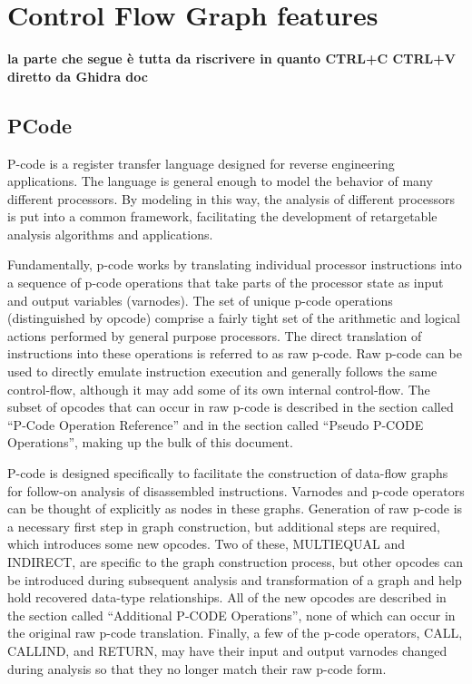 \section{Control Flow Graph features}

\textbf{la parte che segue è tutta da riscrivere in quanto CTRL+C CTRL+V diretto da Ghidra doc} \cite{ghidra_pcode}
\subsection{PCode}
P-code is a register transfer language designed for reverse engineering applications. The language is general enough to model the behavior of many different processors. By modeling in this way, the analysis of different processors is put into a common framework, facilitating the development of retargetable analysis algorithms and applications.

Fundamentally, p-code works by translating individual processor instructions into a sequence of p-code operations that take parts of the processor state as input and output variables (varnodes). The set of unique p-code operations (distinguished by opcode) comprise a fairly tight set of the arithmetic and logical actions performed by general purpose processors. The direct translation of instructions into these operations is referred to as raw p-code. Raw p-code can be used to directly emulate instruction execution and generally follows the same control-flow, although it may add some of its own internal control-flow. The subset of opcodes that can occur in raw p-code is described in the section called “P-Code Operation Reference” and in the section called “Pseudo P-CODE Operations”, making up the bulk of this document.

P-code is designed specifically to facilitate the construction of data-flow graphs for follow-on analysis of disassembled instructions. Varnodes and p-code operators can be thought of explicitly as nodes in these graphs. Generation of raw p-code is a necessary first step in graph construction, but additional steps are required, which introduces some new opcodes. Two of these, MULTIEQUAL and INDIRECT, are specific to the graph construction process, but other opcodes can be introduced during subsequent analysis and transformation of a graph and help hold recovered data-type relationships. All of the new opcodes are described in the section called “Additional P-CODE Operations”, none of which can occur in the original raw p-code translation. Finally, a few of the p-code operators, CALL, CALLIND, and RETURN, may have their input and output varnodes changed during analysis so that they no longer match their raw p-code form.
